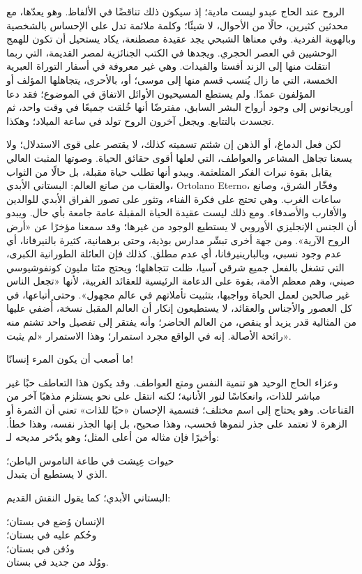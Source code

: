 الروح عند الحاج عبدو ليست مادية؛ إذ سيكون ذلك تناقضًا في الألفاظ. وهو يعدّها، مع محدثين كثيرين، حالًا من الأحوال، لا شيئًا؛ وكلمة ملائمة تدل على الإحساس بالشخصية وبالهوية الفردية. وفي معناها الشبحي يجد عقيدة مصطنعة، يكاد يستحيل أن تكون للهمج الوحشيين في العصر الحجري. ويجدها في الكتب الجنائزية لمصر القديمة، التي ربما انتقلت منها إلى الزند أفستا والفيدات. وهي غير معروفة في أسفار التوراة العبرية الخمسة، التي ما زال يُنسب قسم منها إلى موسى؛ أو، بالأحرى، يتجاهلها المؤلف أو المؤلفون عمدًا. ولم يستطع المسيحيون الأوائل الاتفاق في الموضوع؛ فقد دعا أوريجانوس إلى وجود أرواح البشر السابق، مفترضًا أنها خُلقت جميعًا في وقت واحد، ثم تجسدت بالتتابع. ويجعل آخرون الروح تولد في ساعة الميلاد؛ وهكذا.

لكن فعل الدماغ، أو الذهن إن شئتم تسميته كذلك، لا يقتصر على قوى الاستدلال؛ ولا يسعنا تجاهل المشاعر والعواطف، التي لعلها أقوى حقائق الحياة. وصوتها المثبت العالي يقابل بقوة نبرات الفكر المتلعثمة. ويبدو أنها تطلب حياة مقبلة، بل حالًا من الثواب والعقاب من صانع العالم: البستاني الأبدي، \textenglish{Ortolano Eterno}، وفخّار الشرق، وصانع ساعات الغرب. وهي تحتج على فكرة الفناء، وتثور على تصور الفراق الأبدي للوالدين والأقارب والأصدقاء. ومع ذلك ليست عقيدة الحياة المقبلة عامة جامعة بأي حال. ويبدو أن الجنس الإنجليزي الأوروبي لا يستطيع الوجود من غيرها؛ وقد سمعنا مؤخرًا عن «أرض الروح الآرية». ومن جهة أخرى تبشّر مدارس بوذية، وحتى برهمانية، كثيرة بالنيرفانا، أي عدم وجود نسبي، وبالبارينيرفانا، أي عدم مطلق. كذلك فإن العائلة الطورانية الكبرى، التي تشغل بالفعل جميع شرقي آسيا، ظلت تتجاهلها؛ ويحتج مئتا مليون كونفوشيوسي صيني، وهم معظم الأمة، بقوة على الدعامة الرئيسية للعقائد الغربية، لأنها «تجعل الناس غير صالحين لعمل الحياة وواجبها، بتثبيت تأملاتهم في عالم مجهول». وحتى أتباعها، في كل العصور والأجناس والعقائد، لا يستطيعون إنكار أن العالم المقبل نسخة، أُضفي عليها من المثالية قدر يزيد أو ينقص، من العالم الحاضر؛ وأنه يفتقر إلى تفصيل واحد تشتم منه رائحة الأصالة. إنه في الواقع مجرد استمرار؛ وهذا الاستمرار «لم يثبت».

\begin{SourceQuotation}
ما أصعب أن يكون المرء إنسانًا!
\end{SourceQuotation}

وعزاء الحاج الوحيد هو تنمية النفس ومتع العواطف. وقد يكون هذا التعاطف حبًا غير مباشر للذات، وانعكاسًا لنور الأنانية؛ لكنه انتقل على نحو يستلزم مذهبًا آخر من القناعات. وهو يحتاج إلى اسم مختلف؛ فتسمية الإحسان «حبًا للذات» تعني أن الثمرة أو الزهرة لا تعتمد على جذر لنموها فحسب، وهذا صحيح، بل إنها الجذر نفسه، وهذا خطأ. وأخيرًا فإن مثاله من أعلى المثل؛ وهو يدّخر مديحه لـ:

\begin{SourceQuotation}
حيوات عِيشت في طاعة الناموس الباطن؛\\
الذي لا يستطيع أن يتبدل.
\end{SourceQuotation}

البستاني الأبدي؛ كما يقول النقش القديم:

\begin{SourceQuotation}
الإنسان وُضع في بستان؛\\
وحُكم عليه في بستان؛\\
ودُفن في بستان؛\\
ووُلد من جديد في بستان.
\end{SourceQuotation}
